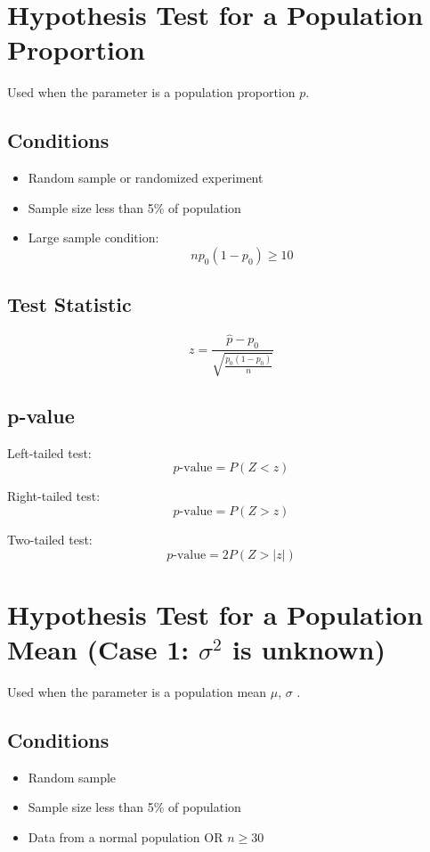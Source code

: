\documentclass[11pt]{article}
\begin{document}
\section{Hypothesis Test for a Population Proportion}

Used when the parameter is a population proportion $p$.

\subsection{Conditions}

\begin{itemize}
\item Random sample or randomized experiment
\item Sample size less than 5\% of population
\item Large sample condition:
\[
np_0(1-p_0) \ge 10
\]
\end{itemize}

\subsection{Test Statistic}

\[
z =
\frac{\hat{p}-p_0}
{\sqrt{\frac{p_0(1-p_0)}{n}}}
\]

\subsection{p-value}

Left-tailed test:
\[
p\text{-value}=P(Z<z)
\]

Right-tailed test:
\[
p\text{-value}=P(Z>z)
\]

Two-tailed test:
\[
p\text{-value}=2P(Z>|z|)
\]

\section{Hypothesis Test for a Population Mean (Case 1: $\sigma^2$ is unknown)}

Used when the parameter is a population mean $\mu$, $\sigma$ .

\subsection{Conditions}

\begin{itemize}
\item Random sample
\item Sample size less than 5\% of population
\item Data from a normal population OR $n \ge 30$
\end{itemize}
\end{document}
